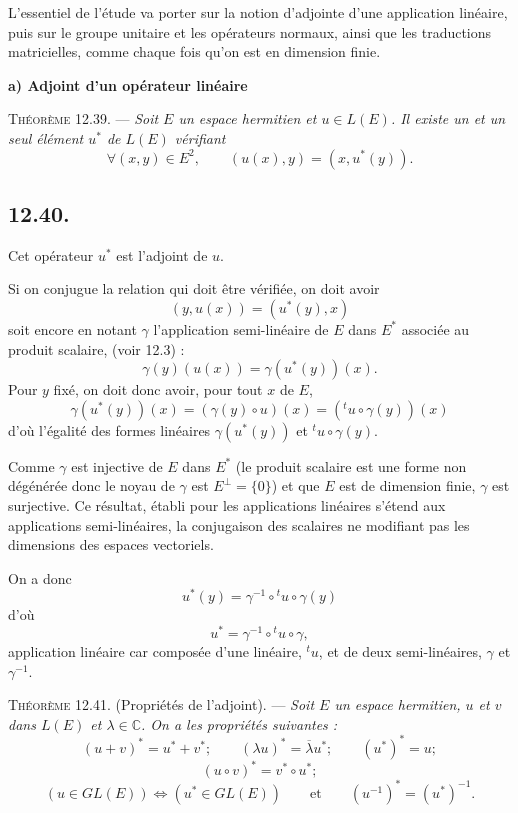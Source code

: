 
L'essentiel de l'étude va porter sur la notion d'adjointe d'une application linéaire, puis sur le groupe unitaire et les opérateurs normaux, ainsi que les traductions matricielles, comme chaque fois qu'on est en dimension finie.

\medskip\noindent\textbf{a) Adjoint d'un opérateur linéaire}

\medskip\noindent\textsc{Théorème 12.39.} --- \emph{Soit $E$ un espace hermitien et $u\in L(E)$. Il existe un et un seul élément $u^*$ de $L(E)$ vérifiant
\[
\forall(x,y)\in E^2,\qquad (u(x),y)=(x,u^*(y)).
\]}

\subsection*{12.40.}
Cet opérateur $u^*$ est l'adjoint de $u$.

Si on conjugue la relation qui doit être vérifiée, on doit avoir
\[
(y,u(x))=(u^*(y),x)
\]
soit encore en notant $\gamma$ l'application semi-linéaire de $E$ dans $E^*$ associée au produit scalaire, (voir 12.3) :
\[
\gamma(y)(u(x))=\gamma(u^*(y))(x).
\]
Pour $y$ fixé, on doit donc avoir, pour tout $x$ de $E$,
\[
\gamma(u^*(y))(x)=(\gamma(y)\circ u)(x)=({}^tu\circ\gamma(y))(x)
\]
d'où l'égalité des formes linéaires $\gamma(u^*(y))$ et ${}^tu\circ\gamma(y)$.

Comme $\gamma$ est injective de $E$ dans $E^*$ (le produit scalaire est une forme non dégénérée donc le noyau de $\gamma$ est $E^\perp=\{0\}$) et que $E$ est de dimension finie, $\gamma$ est surjective. Ce résultat, établi pour les applications linéaires s'étend aux applications semi-linéaires, la conjugaison des scalaires ne modifiant pas les dimensions des espaces vectoriels.

On a donc
\[
u^*(y)=\gamma^{-1}\circ{}^tu\circ\gamma(y)
\]
d'où
\[
u^*=\gamma^{-1}\circ{}^tu\circ\gamma,
\]
application linéaire car composée d'une linéaire, ${}^tu$, et de deux semi-linéaires, $\gamma$ et $\gamma^{-1}$. \bookend

\medskip\noindent\textsc{Théorème 12.41.} (Propriétés de l'adjoint). --- \emph{Soit $E$ un espace hermitien, $u$ et $v$ dans $L(E)$ et $\lambda\in\mathbb C$. On a les propriétés suivantes :
\[
(u+v)^*=u^*+v^*;\qquad (\lambda u)^*=\overline\lambda u^*;\qquad (u^*)^*=u;
\]
\[
(u\circ v)^*=v^*\circ u^*;
\]
\[
(u\in GL(E))\Longleftrightarrow(u^*\in GL(E))
\qquad\text{et}\qquad
(u^{-1})^*=(u^*)^{-1}.
\]}

